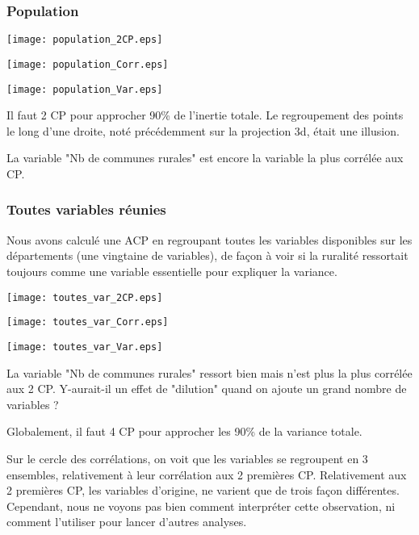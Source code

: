 \documentclass[a4paper,11pt]{article}
\begin{document}
\subsubsection{Population}
\begin{center}
\texttt{[image: population\_2CP.eps]}
\end{center}
\begin{center}
\texttt{[image: population\_Corr.eps]}
\end{center}
\begin{center}
\texttt{[image: population\_Var.eps]}
\end{center}
Il faut 2 CP pour approcher 90\% de l'inertie totale.
Le regroupement des points le long d'une droite, noté précédemment sur la projection 3d, était une illusion.

La variable "Nb de communes rurales" est encore la variable la plus corrélée aux CP.


\subsubsection{Toutes variables réunies}
Nous avons calculé une ACP en regroupant toutes les variables disponibles sur les départements (une vingtaine de variables), de façon à voir si la ruralité ressortait toujours comme une variable essentielle pour expliquer la variance.

\begin{center}
\texttt{[image: toutes\_var\_2CP.eps]}
\end{center}
\begin{center}
\texttt{[image: toutes\_var\_Corr.eps]}
\end{center}
\begin{center}
\texttt{[image: toutes\_var\_Var.eps]}
\end{center}

La variable "Nb de communes rurales" ressort bien mais n'est plus la plus corrélée aux 2 CP.
Y-aurait-il un effet de "dilution" quand on ajoute un grand nombre de variables ?

Globalement, il faut 4 CP pour approcher les 90\% de la variance totale.

Sur le cercle des corrélations, on voit que les variables se regroupent en 3 ensembles, relativement à leur corrélation aux 2 premières CP.
Relativement aux 2 premières CP, les variables d'origine, ne varient que de trois façon différentes.
Cependant, nous ne voyons pas bien comment interpréter cette observation, ni comment l'utiliser pour lancer d'autres analyses.
\end{document}
